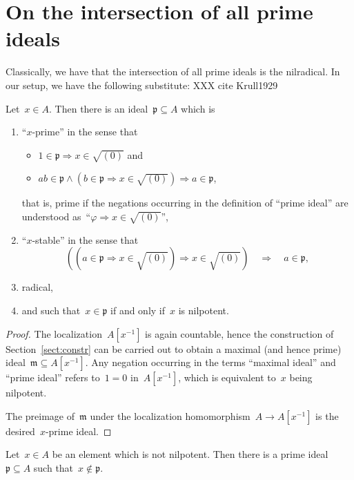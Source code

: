 \documentclass[envcountsect,envcountsame,runningheads]{llncs}
\newcommand{\mmm}{\mathfrak{m}}
\newcommand{\ppp}{\mathfrak{p}}
\renewcommand{\_}{\mathpunct{.}\,}
\begin{document}
\section{On the intersection of all prime ideals}

Classically, we have that the intersection of all prime ideals is the
nilradical. In our setup, we have the following substitute:
XXX cite Krull1929

\begin{lemma}\label{lemma:x-prime}
Let~$x \in A$. Then there is an ideal~$\ppp \subseteq A$ which is
\begin{enumerate}
\item ``$x$-prime'' in the sense that
\begin{itemize}
\item $1 \in \ppp \Rightarrow x \in \sqrt{(0)}$ and
\item $ab \in \ppp \wedge (b \in \ppp \Rightarrow x \in \sqrt{(0)}) \Longrightarrow
   a \in \ppp$,
\end{itemize}
that is, prime if the negations occurring in the definition of ``prime ideal''
are understood as~``$\varphi \Rightarrow x \in \sqrt{(0)}$'',
\item ``$x$-stable'' in the sense that
\[ ((a \in \ppp \Rightarrow x \in \sqrt{(0)}) \Rightarrow x \in \sqrt{(0)})
  \quad\Longrightarrow\quad a \in \ppp, \]
\item radical,
\item and such that~$x \in \ppp$ if and only if~$x$ is nilpotent.
\end{enumerate}
\end{lemma}

\begin{proof}The localization~$A[x^{-1}]$ is again countable, hence the
construction of Section~\ref{sect:constr} can be carried out to obtain a
maximal (and hence prime) ideal~$\mmm \subseteq A[x^{-1}]$. Any negation
occurring in the terms ``maximal ideal'' and ``prime ideal'' refers to~$1 = 0$
in~$A[x^{-1}]$, which is equivalent to~$x$ being nilpotent.

The preimage of~$\mmm$ under the localization homomorphism~$A \to A[x^{-1}]$ is
the desired~$x$-prime ideal.
\end{proof}

\begin{corollary}\label{prop:nilp-prime}Let~$x \in A$ be an element which is not nilpotent. Then there is a
prime ideal~$\ppp \subseteq A$ such that~$x \not\in \ppp$.
\end{corollary}
\end{document}
